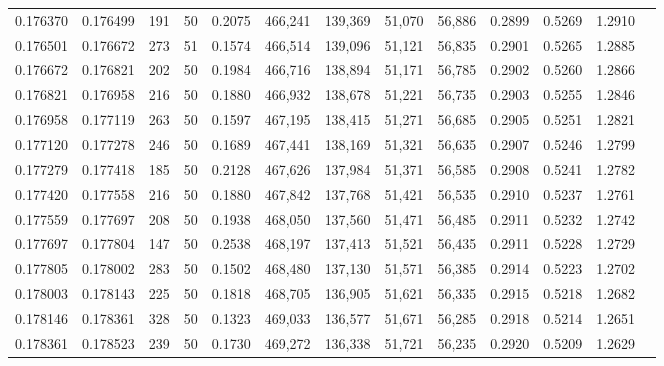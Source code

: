 \begin{tabular}{rrrrrrrrrrrrr}
0.176370 & 0.176499 &   191 &  50 &                                     0.2075 & 466,241 & 139,369 &  51,070 &  56,886 & 0.2899 & 0.5269 & 1.2910 \\
0.176501 & 0.176672 &   273 &  51 &                                     0.1574 & 466,514 & 139,096 &  51,121 &  56,835 & 0.2901 & 0.5265 & 1.2885 \\
0.176672 & 0.176821 &   202 &  50 &                                     0.1984 & 466,716 & 138,894 &  51,171 &  56,785 & 0.2902 & 0.5260 & 1.2866 \\
0.176821 & 0.176958 &   216 &  50 &                                     0.1880 & 466,932 & 138,678 &  51,221 &  56,735 & 0.2903 & 0.5255 & 1.2846 \\
0.176958 & 0.177119 &   263 &  50 &                                     0.1597 & 467,195 & 138,415 &  51,271 &  56,685 & 0.2905 & 0.5251 & 1.2821 \\
0.177120 & 0.177278 &   246 &  50 &                                     0.1689 & 467,441 & 138,169 &  51,321 &  56,635 & 0.2907 & 0.5246 & 1.2799 \\
0.177279 & 0.177418 &   185 &  50 &                                     0.2128 & 467,626 & 137,984 &  51,371 &  56,585 & 0.2908 & 0.5241 & 1.2782 \\
0.177420 & 0.177558 &   216 &  50 &                                     0.1880 & 467,842 & 137,768 &  51,421 &  56,535 & 0.2910 & 0.5237 & 1.2761 \\
0.177559 & 0.177697 &   208 &  50 &                                     0.1938 & 468,050 & 137,560 &  51,471 &  56,485 & 0.2911 & 0.5232 & 1.2742 \\
0.177697 & 0.177804 &   147 &  50 &                                     0.2538 & 468,197 & 137,413 &  51,521 &  56,435 & 0.2911 & 0.5228 & 1.2729 \\
0.177805 & 0.178002 &   283 &  50 &                                     0.1502 & 468,480 & 137,130 &  51,571 &  56,385 & 0.2914 & 0.5223 & 1.2702 \\
0.178003 & 0.178143 &   225 &  50 &                                     0.1818 & 468,705 & 136,905 &  51,621 &  56,335 & 0.2915 & 0.5218 & 1.2682 \\
0.178146 & 0.178361 &   328 &  50 &                                     0.1323 & 469,033 & 136,577 &  51,671 &  56,285 & 0.2918 & 0.5214 & 1.2651 \\
0.178361 & 0.178523 &   239 &  50 &                                     0.1730 & 469,272 & 136,338 &  51,721 &  56,235 & 0.2920 & 0.5209 & 1.2629 \\

\end{tabular}
